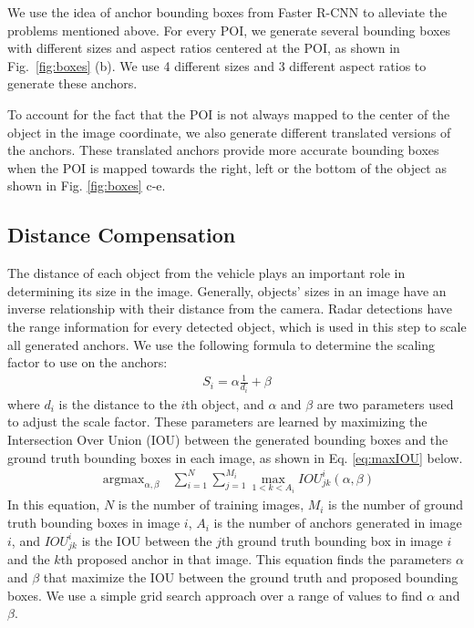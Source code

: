\documentclass{article}
\DeclareMathOperator*{\argmax}{argmax}
\begin{document}
We use the idea of anchor bounding boxes from 
Faster R-CNN \cite{ren2015faster} to alleviate the problems mentioned above. For every 
POI, we generate several bounding boxes with different sizes and aspect ratios 
centered at the POI, as shown in Fig.~\ref{fig:boxes} (b). 
We use 4 different sizes and 3 different aspect ratios to generate these anchors.

To account for the fact that the POI is not always mapped to the center of the object 
in the image coordinate, we also generate different translated versions of the 
anchors. These translated anchors provide more accurate bounding boxes when the 
POI is mapped towards the right, left or the bottom of the object as shown in 
Fig. \ref{fig:boxes} c-e.

\subsection{Distance Compensation}
The distance of each object from the vehicle plays an important role in 
determining its size in the image. Generally, objects' sizes in an image have 
an inverse relationship with their distance from the camera. Radar detections have 
the range information for every detected object, which is used in this step to 
scale all generated anchors. We use the following formula to determine the scaling factor 
to use on the anchors:
\begin{gather}
  S_i = \alpha \frac{1}{d_i} + \beta
\label{eq:scale}
\end{gather}
where $d_i$ is the distance to the $i$th object, and $\alpha$ and $\beta$ are two 
parameters used to adjust the scale 
factor. These parameters are learned by maximizing the Intersection Over Union (IOU) 
between the generated bounding 
boxes and the ground truth bounding boxes in each image, as shown in 
Eq. \ref{eq:maxIOU} below.
\begin{gather}
  \argmax_{\alpha, \beta} \hspace{8pt} \sum_{i=1}^{N} \sum_{j=1}^{M_i} \max_{1<k<A_i} IOU_{jk}^i(\alpha, \beta)
\label{eq:maxIOU}
\end{gather}
In this equation, $N$ is the number of training images, $M_i$ is the number of ground truth 
bounding boxes in image $i$, 
$A_i$ is the number of anchors generated in image $i$, and $IOU_{jk}^i$ is the IOU 
between the $j$th ground truth bounding box in image $i$ and the $k$th proposed 
anchor in that image. This equation finds the parameters $\alpha$ and $\beta$ 
that maximize the IOU between the ground truth and proposed bounding boxes. We use a simple grid search approach over a range of values to find $\alpha$ and $\beta$.
\end{document}
